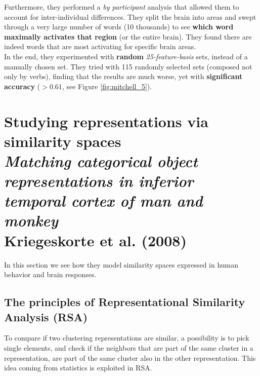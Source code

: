 Furthermore, they performed a \textit{by participant} analysis that allowed them to account for inter-individual differences. They split the brain into areas and swept through a very large number of words (10 thousands) to see \textbf{which word maximally activates that region} (or the entire brain).
They found there are indeed words that are most activating for specific brain areas.\\

In the end, they experimented with \textbf{random} \textit{25-feature-basis} sets, instead of a manually chosen set. They tried with 115 randomly selected sets (composed not only by verbs), finding that the results are much worse, yet with \textbf{significant accuracy} ($>0.61$, see Figure \ref{fig:mitchell_5}).




\section[Studying representations via similarity spaces]{Studying representations via similarity spaces\\ \large{\textit{Matching categorical object representations in inferior temporal cortex of man and monkey}\\ Kriegeskorte et al. (2008)}}
\label{sec:kriegeskorte}
In this section we see how they model similarity spaces expressed in human behavior and brain responses.

\subsection{The principles of Representational Similarity Analysis (RSA)}
To compare if two clustering representations are similar, a possibility is to pick single elements, and check if the neighbors that are part of the same cluster in a representation, are part of the same cluster also in the other representation. This idea coming from statistics is exploited in RSA.

